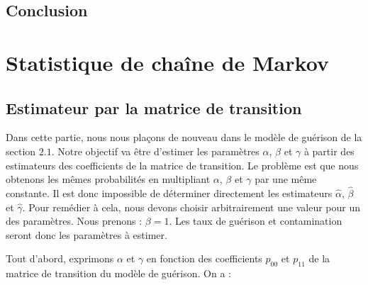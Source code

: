 \documentclass[12pt,a4paper]{report}
\theoremstyle{remark}
\begin{document}
\section{Conclusion}
\newpage
\chapter{Statistique de chaîne de Markov}

\section{Estimateur par la matrice de transition}
\vspace{0.6cm}

Dans cette partie, nous nous plaçons de nouveau dans le modèle de guérison de la section $2.1$. Notre objectif va être d'estimer les paramètres $\alpha$, $\beta$ et $\gamma$ à partir des estimateurs des coefficients de la matrice de transition. Le problème est que nous obtenons les mêmes probabilités en multipliant $\alpha$, $\beta$ et $\gamma$ par une même constante. Il est donc impossible de déterminer directement les estimateurs $\hat{\alpha}$, $\hat{\beta}$ et $\hat{\gamma}$. Pour remédier à cela, nous devons choisir arbitrairement une valeur pour un des paramètres. Nous prenons : $\beta = 1$. Les taux de guérison et contamination seront donc les paramètres à estimer.

Tout d'abord, exprimons $\alpha$ et $\gamma$ en fonction des coefficients $p_00$ et $p_11$ de la matrice de transition du modèle de guérison.
On a : 
\end{document}
